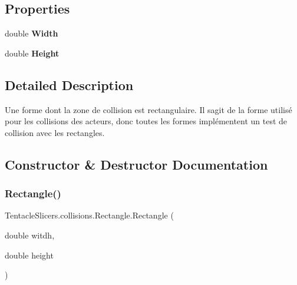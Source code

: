 \subsection*{Properties}
\begin{DoxyCompactItemize}
\item 
\mbox{\label{class_tentacle_slicers_1_1collisions_1_1_rectangle_af19b1b5da2211b18a5b2f0dd9be7086b}} 
double {\bfseries Width}
\item 
\mbox{\label{class_tentacle_slicers_1_1collisions_1_1_rectangle_a1aa5df69dd897fb8437365f88793ee40}} 
double {\bfseries Height}
\end{DoxyCompactItemize}


\subsection{Detailed Description}
Une forme dont la zone de collision est rectangulaire. Il s\textquotesingle{}agit de la forme utilisé pour les collisions des acteurs, donc toutes les formes implémentent un test de collision avec les rectangles. 



\subsection{Constructor \& Destructor Documentation}
\mbox{\label{class_tentacle_slicers_1_1collisions_1_1_rectangle_acfb56947ab8ea94dcba7fb6ce2956b9f}} 
\subsubsection{\texorpdfstring{Rectangle()}{Rectangle()}}
{\footnotesize\ttfamily Tentacle\+Slicers.\+collisions.\+Rectangle.\+Rectangle (\begin{DoxyParamCaption}\item[{double}]{witdh,  }\item[{double}]{height }\end{DoxyParamCaption})}



